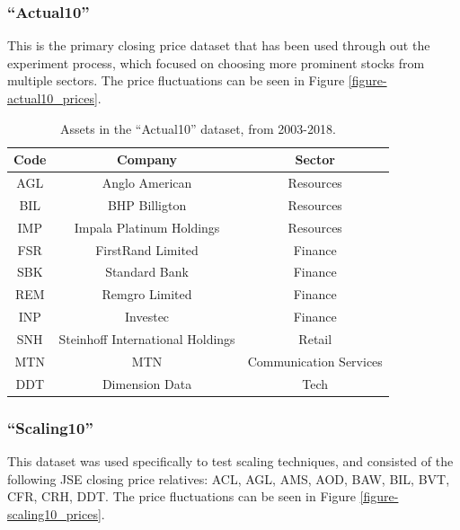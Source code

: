 \documentclass[a4paper,11pt,oneside]{article}
\theoremstyle{plain}
\theoremstyle{definition}
\begin{document}
	\subsubsection{``Actual10''}\label{dataset_actual10}
	
	This is the primary closing price dataset that has been used through out the experiment process, which focused on choosing more prominent stocks from multiple sectors. The price fluctuations can be seen in Figure \ref{figure-actual10_prices}.
	
	\begin{table}[H]
		\centering
		\begin{tabular}{|c|c|c|}
			\hline
			\textbf{Code} &\textbf{Company} & \textbf{Sector} \\\hline	
			{AGL} & {Anglo American} & {Resources}  \\\hline
			{BIL} & {BHP Billigton} & {Resources}  \\\hline
			{IMP} & {Impala Platinum Holdings} & {Resources}  \\\hline
			{FSR} & {FirstRand Limited} & {Finance}  \\\hline
			{SBK} & {Standard Bank} & {Finance}  \\\hline
			{REM} & {Remgro Limited} & {Finance}  \\\hline
			{INP} & {Investec} & {Finance}  \\\hline
			{SNH} & {Steinhoff International Holdings} & {Retail}    \\\hline
			{MTN} & {MTN} & {Communication Services}  \\\hline
			{DDT} & {Dimension Data} & {Tech} \\\hline
		\end{tabular}
		\newline\newline
		\caption{Assets in the ``Actual10'' dataset, from 2003-2018. }\label{tab_actual10}
	\end{table}
	
	\subsubsection{``Scaling10''}\label{dataset_scaling10}
	
	 This dataset was used specifically to test scaling techniques, and consisted of the following JSE closing price relatives: ACL, AGL, AMS, AOD, BAW, BIL, BVT, CFR, CRH, DDT. The price fluctuations can be seen in Figure \ref{figure-scaling10_prices}.
	
\end{document}
